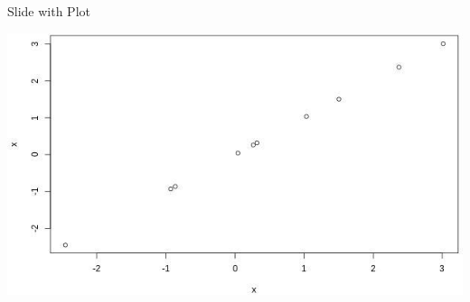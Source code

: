\documentclass[ignorenonframetext,]{beamer}
\begin{document}
\begin{frame}{Slide with Plot}
\protect\hypertarget{slide-with-plot}{}

\scriptsize\includegraphics{example_files/figure-beamer/unnamed-chunk-3-1.jpeg}

\end{frame}

\section[]{}
\end{document}
